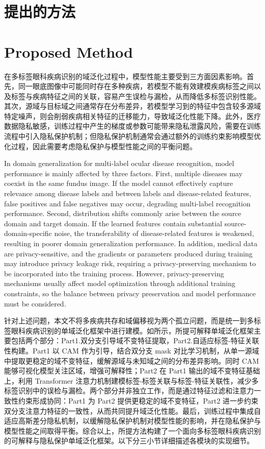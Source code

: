 \section{提出的方法}\label{ux63d0ux51faux7684ux65b9ux6cd5}

\section*{Proposed Method}

在多标签眼科疾病识别的域泛化过程中，模型性能主要受到三方面因素影响。首先，同一眼底图像中可能同时存在多种疾病，若模型不能有效建模疾病标签之间以及标签与疾病特征之间的关联，容易产生误检与漏检，从而降低多标签识别性能。其次，源域与目标域之间通常存在分布差异，若模型学习到的特征中包含较多源域特定噪声，则会削弱疾病相关特征的迁移能力，导致域泛化性能下降。此外，医疗数据隐私敏感，训练过程中产生的梯度或参数可能带来隐私泄露风险，需要在训练流程中引入隐私保护机制；但隐私保护机制通常会通过额外的训练约束影响模型优化过程，因此需要考虑隐私保护与模型性能之间的平衡问题。

In domain generalization for multi-label ocular disease recognition, model performance is mainly affected by three factors. First, multiple diseases may coexist in the same fundus image. If the model cannot effectively capture relevance among disease labels and between labels and disease-related features, false positives and false negatives may occur, degrading multi-label recognition performance. Second, distribution shifts commonly arise between the source domain and target domain. If the learned features contain substantial source-domain-specific noise, the transferability of disease-related features is weakened, resulting in poorer domain generalization performance. In addition, medical data are privacy-sensitive, and the gradients or parameters produced during training may introduce privacy leakage risk, requiring a privacy-preserving mechanism to be incorporated into the training process. However, privacy-preserving mechanisms usually affect model optimization through additional training constraints, so the balance between privacy preservation and model performance must be considered.

针对上述问题，本文不将多疾病共存和域偏移视为两个孤立问题，而是统一到多标签眼科疾病识别的单域泛化框架中进行建模。如所示，所提可解释单域泛化框架主要包括两个部分：Part1.双分支引导域不变特征提取，Part2.自适应标签-特征关联性构建。Part1 以 CAM 作为引导，结合双分支 mask 对比学习机制，从单一源域中提取更稳定的域不变特征，缓解源域与未知域之间的分布差异影响。同时 CAM 能够可视化模型关注区域，增强可解释性；Part2 在 Part1 输出的域不变特征基础上，利用 Transformer 注意力机制建模标签-标签关联与标签-特征关联性，减少多标签识别中的误检与漏检。两个部分并非独立工作，而是通过特征过滤和注意力一致性约束形成协同：Part1 为 Part2 提供更稳定的域不变特征，Part2 进一步约束双分支注意力特征的一致性，从而共同提升域泛化性能。最后，训练过程中集成自适应高斯差分隐私机制，以缓解隐私保护机制对模型性能的影响，并在隐私保护与模型性能之间取得平衡。综合以上，所提方法构建了一个面向多标签眼科疾病识别的可解释与隐私保护单域泛化框架。以下分三小节详细描述各模块的实现细节。

